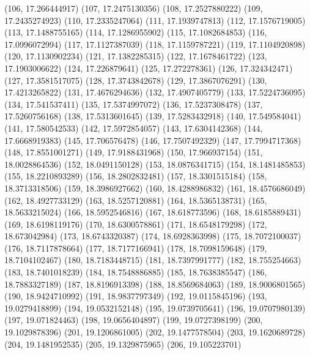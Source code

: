 {					(106, 17.266444917)
					(107, 17.2475130356)
					(108, 17.2527880222)
					(109, 17.2435274923)
					(110, 17.2335247064)
					(111, 17.1939747813)
					(112, 17.1576719005)
					(113, 17.1488755165)
					(114, 17.1286955902)
					(115, 17.1082684853)
					(116, 17.0996072994)
					(117, 17.1127387039)
					(118, 17.1159787221)
					(119, 17.1104920898)
					(120, 17.1130902234)
					(121, 17.1382285315)
					(122, 17.1678461722)
					(123, 17.1903006622)
					(124, 17.226879641)
					(125, 17.272278361)
					(126, 17.324342471)
					(127, 17.3581517075)
					(128, 17.3743842678)
					(129, 17.3867076291)
					(130, 17.4213265822)
					(131, 17.4676294636)
					(132, 17.4907405779)
					(133, 17.5224736095)
					(134, 17.541537411)
					(135, 17.5374997072)
					(136, 17.5237308478)
					(137, 17.5260756168)
					(138, 17.5313601645)
					(139, 17.5283432918)
					(140, 17.549584041)
					(141, 17.580542533)
					(142, 17.5972854057)
					(143, 17.6304142368)
					(144, 17.6668919383)
					(145, 17.706576478)
					(146, 17.7507492329)
					(147, 17.7994717368)
					(148, 17.8551001271)
					(149, 17.9188431968)
					(150, 17.966937154)
					(151, 18.0028864536)
					(152, 18.0491150128)
					(153, 18.0876341715)
					(154, 18.1481485853)
					(155, 18.2210893289)
					(156, 18.2802832481)
					(157, 18.3301515184)
					(158, 18.3713318506)
					(159, 18.3986927662)
					(160, 18.4288986832)
					(161, 18.4576686049)
					(162, 18.4927733129)
					(163, 18.5257120881)
					(164, 18.5365138731)
					(165, 18.5633215024)
					(166, 18.5952546816)
					(167, 18.618773596)
					(168, 18.6185889431)
					(169, 18.6198119176)
					(170, 18.6300578861)
					(171, 18.6548179298)
					(172, 18.673042984)
					(173, 18.6743320387)
					(174, 18.6928363998)
					(175, 18.7072100037)
					(176, 18.7117878664)
					(177, 18.7177166941)
					(178, 18.7098159648)
					(179, 18.7104102467)
					(180, 18.7183448715)
					(181, 18.7397991777)
					(182, 18.755254663)
					(183, 18.7401018239)
					(184, 18.7548886885)
					(185, 18.7638385547)
					(186, 18.7883327189)
					(187, 18.8196913398)
					(188, 18.8569684063)
					(189, 18.9006801565)
					(190, 18.9424710992)
					(191, 18.9837797349)
					(192, 19.0115845196)
					(193, 19.0279418899)
					(194, 19.0532152148)
					(195, 19.0739705641)
					(196, 19.0707980139)
					(197, 19.071824463)
					(198, 19.0656404897)
					(199, 19.0727398199)
					(200, 19.1029878396)
					(201, 19.1206861005)
					(202, 19.1477578504)
					(203, 19.1620689728)
					(204, 19.1481952535)
					(205, 19.1329875965)
					(206, 19.105223701)
}
